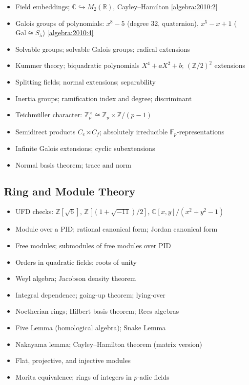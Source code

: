 \begin{itemize}
  \item Field embeddings; $\mathbb{C}\hookrightarrow M_2(\mathbb{R})$, Cayley--Hamilton \hfill \cref{algebra:2010:2}
  \item Galois groups of polynomials: $x^8-5$ (degree 32, quaternion), $x^5-x+1$ ($\mathrm{Gal}\cong S_5$) \hfill \cref{algebra:2010:4}
  \item Solvable groups; solvable Galois groups; radical extensions
  \item Kummer theory; biquadratic polynomials $X^4+aX^2+b$; $(\mathbb{Z}/2)^2$ extensions
  \item Splitting fields; normal extensions; separability
  \item Inertia groups; ramification index and degree; discriminant
  \item Teichm\"uller character: $\mathbb{Z}_p^\times\cong\mathbb{Z}_p\times\mathbb{Z}/(p-1)$
  \item Semidirect products $C_e\rtimes C_f$; absolutely irreducible $\mathbb{F}_p$-representations
  \item Infinite Galois extensions; cyclic subextensions
  \item Normal basis theorem; trace and norm
\end{itemize}

\subsection{Ring and Module Theory}

\begin{itemize}
  \item UFD checks: $\mathbb{Z}[\sqrt6]$, $\mathbb{Z}[(1+\sqrt{-11})/2]$, $\mathbb{C}[x,y]/(x^2+y^2-1)$
  \item Module over a PID; rational canonical form; Jordan canonical form
  \item Free modules; submodules of free modules over PID
  \item Orders in quadratic fields; roots of unity
  \item Weyl algebra; Jacobson density theorem
  \item Integral dependence; going-up theorem; lying-over
  \item Noetherian rings; Hilbert basis theorem; Rees algebras
  \item Five Lemma (homological algebra); Snake Lemma
  \item Nakayama lemma; Cayley--Hamilton theorem (matrix version)
  \item Flat, projective, and injective modules
  \item Morita equivalence; rings of integers in $p$-adic fields
\end{itemize}

